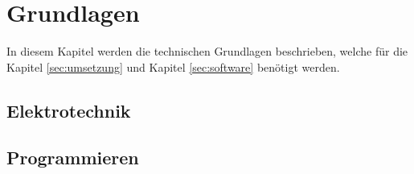 \section{Grundlagen} \label{sec:grundlagen}
In diesem Kapitel werden die technischen Grundlagen beschrieben, welche für die Kapitel \ref{sec:umsetzung} und Kapitel \ref{sec:software} benötigt werden. 

\subsection{Elektrotechnik} \label{subsec:elektrotechnik}



\subsection{Programmieren} \label{subsec:softech}
